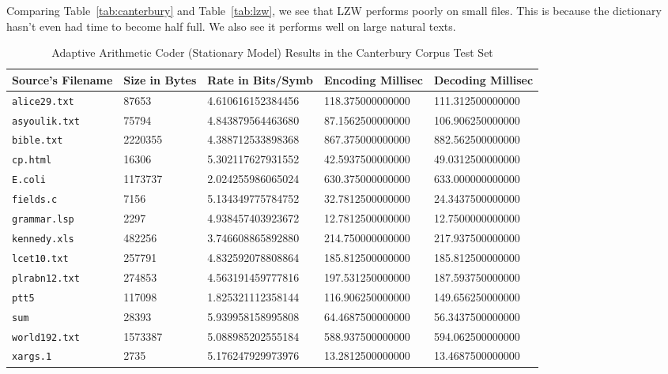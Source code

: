 \documentclass[a4paper, twocolumn]{article}
\begin{document}
        Comparing Table~\ref{tab:canterbury} and Table~\ref{tab:lzw}, we see that LZW performs poorly on small files. This is because the dictionary hasn't even had time to become half full. We also see it performs well on large natural texts.

    \begin{table*}[t]
        \centering
        \begin{tabular}{lllll}
        \toprule
            Source's Filename & Size in Bytes & Rate in Bits/Symb & Encoding Millisec & Decoding Millisec \\
        \midrule
            \texttt{alice29.txt}  &   87653 & 4.610616152384456 & 118.375000000000 & 111.312500000000 \\
            \texttt{asyoulik.txt} &   75794 & 4.843879564463680 & 87.1562500000000 & 106.906250000000 \\
            \texttt{bible.txt}    & 2220355 & 4.388712533898368 & 867.375000000000 & 882.562500000000 \\
            \texttt{cp.html}      &   16306 & 5.302117627931552 & 42.5937500000000 & 49.0312500000000 \\
            \texttt{E.coli}       & 1173737 & 2.024255986065024 & 630.375000000000 & 633.000000000000 \\
            \texttt{fields.c}     &    7156 & 5.134349775784752 & 32.7812500000000 & 24.3437500000000 \\
            \texttt{grammar.lsp}  &    2297 & 4.938457403923672 & 12.7812500000000 & 12.7500000000000 \\
            \texttt{kennedy.xls}  &  482256 & 3.746608865892880 & 214.750000000000 & 217.937500000000 \\
            \texttt{lcet10.txt}   &  257791 & 4.832592078808864 & 185.812500000000 & 185.812500000000 \\
            \texttt{plrabn12.txt} &  274853 & 4.563191459777816 & 197.531250000000 & 187.593750000000 \\
            \texttt{ptt5}         &  117098 & 1.825321112358144 & 116.906250000000 & 149.656250000000 \\
            \texttt{sum}          &   28393 & 5.939958158995808 & 64.4687500000000 & 56.3437500000000 \\
            \texttt{world192.txt} & 1573387 & 5.088985202555184 & 588.937500000000 & 594.062500000000 \\
            \texttt{xargs.1}      &    2735 & 5.176247929973976 & 13.2812500000000 & 13.4687500000000 \\
        \bottomrule
        \end{tabular}
        \caption{Adaptive Arithmetic Coder (Stationary Model) Results in the Canterbury Corpus Test Set}
        \label{tab:aac}
    \end{table*}
\end{document}
